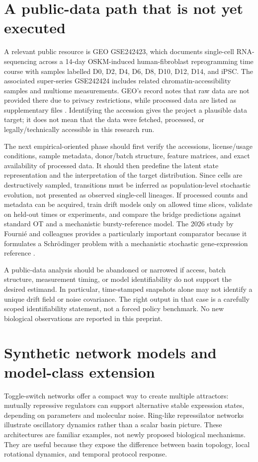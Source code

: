 \documentclass[11pt]{article}
\newcommand{\1}{\mathbf{1}}
\begin{document}
\section{A public-data path that is not yet executed}
A relevant public resource is GEO GSE242423, which documents single-cell RNA-sequencing across a 14-day OSKM-induced human-fibroblast reprogramming time course with samples labelled D0, D2, D4, D6, D8, D10, D12, D14, and iPSC. The associated super-series GSE242424 includes related chromatin-accessibility samples and multiome measurements. GEO's record notes that raw data are not provided there due to privacy restrictions, while processed data are listed as supplementary files \citep{geoGSE242423,geoGSE242424}. Identifying the accession gives the project a plausible data target; it does not mean that the data were fetched, processed, or legally/technically accessible in this research run.

The next empirical-oriented phase should first verify the accessions, license/usage conditions, sample metadata, donor/batch structure, feature matrices, and exact availability of processed data. It should then predefine the latent state representation and the interpretation of the target distribution. Since cells are destructively sampled, transitions must be inferred as population-level stochastic evolution, not presented as observed single-cell lineages. If processed counts and metadata can be acquired, train drift models only on allowed time slices, validate on held-out times or experiments, and compare the bridge predictions against standard OT and a mechanistic bursty-reference model. The 2026 study by Fournié and colleagues provides a particularly important comparator because it formulates a Schrödinger problem with a mechanistic stochastic gene-expression reference \citep{fournie2026schrodinger}.

A public-data analysis should be abandoned or narrowed if access, batch structure, measurement timing, or model identifiability do not support the desired estimand. In particular, time-stamped snapshots alone may not identify a unique drift field or noise covariance. The right output in that case is a carefully scoped identifiability statement, not a forced policy benchmark. No new biological observations are reported in this preprint.

\section{Synthetic network models and model-class extension}
Toggle-switch networks offer a compact way to create multiple attractors: mutually repressive regulators can support alternative stable expression states, depending on parameters and molecular noise. Ring-like repressilator networks illustrate oscillatory dynamics rather than a scalar basin picture. These architectures are familiar examples, not newly proposed biological mechanisms. They are useful because they expose the difference between basin topology, local rotational dynamics, and temporal protocol response.
\end{document}
